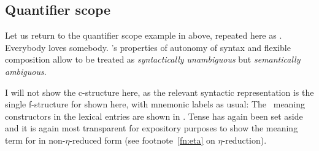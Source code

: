 \documentclass[output=paper,hidelinks]{langscibook}
\begin{document}
\subsection{Quantifier scope}
\label{sec:quantifier-scope}

Let us return to the quantifier scope example in 
above, repeated here as . 
\ea\label{ex:scope2}  Everybody loves somebody. 
\z
%
\glue's properties of autonomy of syntax
and  flexible composition allow  to be treated as 
\emph{syntactically unambiguous} but 
\emph{semantically ambiguous}.

I will not show the c-structure here, as  the relevant syntactic
representation is the single f-structure for  shown here, with mnemonic
labels as usual:
\ea
\label{ex:scope-fs}
\z        
% 
The \glue\ meaning constructors in the lexical entries are shown in
. Tense has again been set aside and it is again most
transparent for expository purposes to show the meaning term for
 in non-$\eta$-reduced form (see footnote~\ref{fn:eta} on $\eta$-reduction).
\ea
\label{ex:scope-lex}
\end{document}
